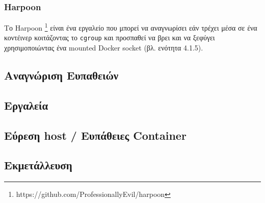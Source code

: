 \subsubsection{\textlatin{Harpoon}}

Το \textlatin{Harpoon}
\footnote{\textlatin{https://github.com/ProfessionallyEvil/harpoon}} είναι ένα
εργαλείο που μπορεί να αναγνωρίσει εάν τρέχει μέσα σε ένα κοντέινερ
κοιτάζοντας το \texttt{\textlatin{cgroup}} και προσπαθεί να βρει και να ξεφύγει
χρησιμοποιώντας ένα \textlatin{mounted Docker socket} (βλ. ενότητα 4.1.5).


\subsection{Αναγνώριση Ευπαθειών}
\subsection{Εργαλεία}
\subsection{Εύρεση \textlatin{host} / Ευπάθειες \textlatin{Container}}
\subsection{Εκμετάλλευση}
